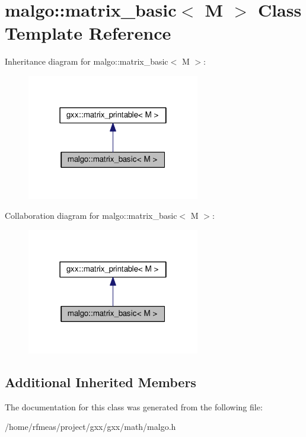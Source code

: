 \hypertarget{classmalgo_1_1matrix__basic}{}\section{malgo\+:\+:matrix\+\_\+basic$<$ M $>$ Class Template Reference}
\label{classmalgo_1_1matrix__basic}


Inheritance diagram for malgo\+:\+:matrix\+\_\+basic$<$ M $>$\+:
\nopagebreak
\begin{figure}[H]
\begin{center}
\leavevmode
\includegraphics[width=214pt]{classmalgo_1_1matrix__basic__inherit__graph}
\end{center}
\end{figure}


Collaboration diagram for malgo\+:\+:matrix\+\_\+basic$<$ M $>$\+:
\nopagebreak
\begin{figure}[H]
\begin{center}
\leavevmode
\includegraphics[width=214pt]{classmalgo_1_1matrix__basic__coll__graph}
\end{center}
\end{figure}
\subsection*{Additional Inherited Members}


The documentation for this class was generated from the following file\+:\begin{DoxyCompactItemize}
\item 
/home/rfmeas/project/gxx/gxx/math/malgo.\+h\end{DoxyCompactItemize}
